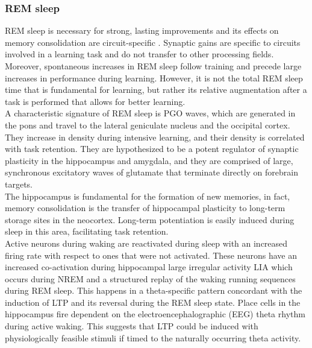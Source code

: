     \subsubsection{REM sleep}
    REM sleep is necessary for strong, lasting improvements and its effects on memory consolidation are circuit-specific \cite{rem-review}.
    Synaptic gains are specific to circuits involved in a learning task and do not transfer to other processing fields.
    Moreover, spontaneous increases in REM sleep follow training and precede large increases in performance during learning.
    However, it is not the total REM sleep time that is fundamental for learning, but rather its relative augmentation after a task is performed that allows for better learning.\\
    A characteristic signature of REM sleep is PGO waves, which are generated in the pons and travel to the lateral geniculate nucleus and the occipital cortex.
    They increase in density during intensive learning, and their density is correlated with task retention.
    They are hypothesized to be a potent regulator of synaptic plasticity in the hippocampus and amygdala, and they are comprised of large, synchronous excitatory waves of glutamate that terminate directly on forebrain targets.\\
    The hippocampus is fundamental for the formation of new memories, in fact, memory consolidation is the transfer of hippocampal plasticity to long-term storage sites in the neocortex.
    Long-term potentiation is easily induced during sleep in this area, facilitating task retention.\\
    Active neurons during waking are reactivated during sleep with an increased firing rate with respect to ones that were not activated.
    These neurons have an increased co-activation during hippocampal large irregular activity LIA which occurs during NREM and a structured replay of the waking running sequences during REM sleep.
    This happens in a theta-specific pattern concordant with the induction of LTP and its reversal during the REM sleep state.
    Place cells in the hippocampus fire dependent on the electroencephalographic (EEG) theta rhythm during active waking.
    This suggests that LTP could be induced with physiologically feasible stimuli if timed to the naturally occurring theta activity.

